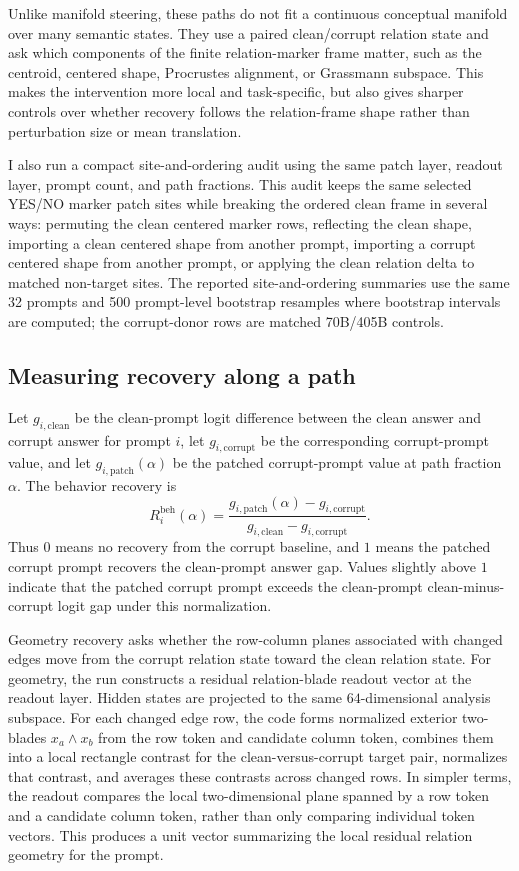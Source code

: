 \documentclass[11pt]{article}
\newcommand{\clean}{\mathrm{clean}}
\newcommand{\corr}{\mathrm{corrupt}}
\newcommand{\patch}{\mathrm{patch}}
\begin{document}
Unlike manifold steering, these paths do not fit a continuous conceptual manifold over many semantic states. They use a paired clean/corrupt relation state and ask which components of the finite relation-marker frame matter, such as the centroid, centered shape, Procrustes alignment, or Grassmann subspace. This makes the intervention more local and task-specific, but also gives sharper controls over whether recovery follows the relation-frame shape rather than perturbation size or mean translation.

I also run a compact site-and-ordering audit using the same patch layer, readout layer, prompt count, and path fractions. This audit keeps the same selected YES/NO marker patch sites while breaking the ordered clean frame in several ways: permuting the clean centered marker rows, reflecting the clean shape, importing a clean centered shape from another prompt, importing a corrupt centered shape from another prompt, or applying the clean relation delta to matched non-target sites. The reported site-and-ordering summaries use the same 32 prompts and 500 prompt-level bootstrap resamples where bootstrap intervals are computed; the corrupt-donor rows are matched 70B/405B controls.

\subsection{Measuring recovery along a path}

Let $g_{i,\clean}$ be the clean-prompt logit difference between the clean answer and corrupt answer for prompt $i$, let $g_{i,\corr}$ be the corresponding corrupt-prompt value, and let $g_{i,\patch}(\alpha)$ be the patched corrupt-prompt value at path fraction $\alpha$. The behavior recovery is
\begin{equation}
R^{\mathrm{beh}}_i(\alpha)=\frac{g_{i,\patch}(\alpha)-g_{i,\corr}}{g_{i,\clean}-g_{i,\corr}}.
\end{equation}
Thus $0$ means no recovery from the corrupt baseline, and $1$ means the patched corrupt prompt recovers the clean-prompt answer gap. Values slightly above $1$ indicate that the patched corrupt prompt exceeds the clean-prompt clean-minus-corrupt logit gap under this normalization.

Geometry recovery asks whether the row-column planes associated with changed edges move from the corrupt relation state toward the clean relation state. For geometry, the run constructs a residual relation-blade readout vector at the readout layer. Hidden states are projected to the same $64$-dimensional analysis subspace. For each changed edge row, the code forms normalized exterior two-blades $x_a\wedge x_b$ from the row token and candidate column token, combines them into a local rectangle contrast for the clean-versus-corrupt target pair, normalizes that contrast, and averages these contrasts across changed rows. In simpler terms, the readout compares the local two-dimensional plane spanned by a row token and a candidate column token, rather than only comparing individual token vectors. This produces a unit vector summarizing the local residual relation geometry for the prompt.
\end{document}
